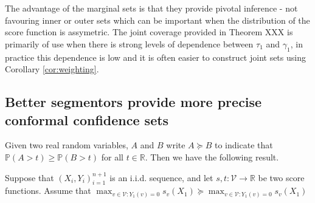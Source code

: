 The advantage of the marginal sets is that they provide pivotal inference - not favouring inner or outer sets which can be important when the distribution of the score function is assymetric. The joint coverage provided in Theorem XXX is primarily of use when there is strong levels of dependence between $\tau_1$ and $\gamma_1$, in practice this dependence is low and it is often easier to construct joint sets using Corollary \ref{cor:weighting}.


%
%

\subsection{Better segmentors provide more precise conformal confidence sets}
Given two real random variables, $A$ and $B$ write $ A \succeq B$ to indicate that $\mathbb{P}\left( A > t \right) \geq \mathbb{P}\left( B > t \right)$ for all $t \in \mathbb{R}$. Then we have the following result. 
\begin{theorem}
	Suppose that $(X_i, Y_i)_{i = 1}^{n+1}$ is an i.i.d. sequence, and let $s, t: \mathcal{V} \rightarrow \mathbb{R}$ be two score functions. Assume that 
	$\max_{v \in \mathcal{V}: Y_1(v) = 0} s_v(X_{1}) \succeq \max_{v \in \mathcal{V}: Y_1(v) = 0} s_v(X_{1}) $
\end{theorem}

